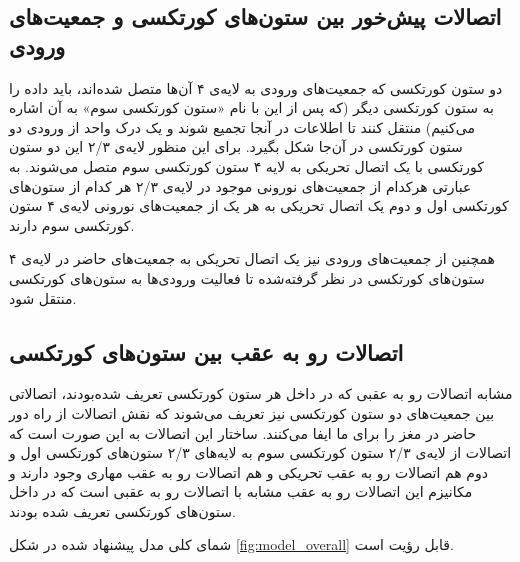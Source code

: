 \documentclass[12pt]{report}
\begin{document}
	
	\subsection{اتصالات پیش‌خور بین ستون‌های کورتکسی و جمعیت‌های ورودی}
	
	دو ستون کورتکسی‌ که جمعیت‌های ورودی به لایه‌ی ۴ آن‌ها متصل شده‌اند، باید داده را به ستون کورتکسی دیگر (که پس از این با نام «ستون کورتکسی سوم» به آن اشاره می‌کنیم) منتقل کنند تا اطلاعات در آنجا تجمیع شوند و یک درک واحد از ورودی دو ستون کورتکسی در آن‌جا شکل بگیرد. برای این منظور لایه‌ی ۲/۳ این دو ستون کورتکسی با یک اتصال تحریکی به لایه ۴ ستون کورتکسی سوم متصل می‌شوند. به عبارتی هرکدام از جمعیت‌های نورونی موجود در لایه‌ی ۲/۳ هر کدام از ستون‌های کورتکسی اول و دوم یک اتصال تحریکی به هر‌ یک از جمعیت‌های نورونی لایه‌ی ۴ ستون کورتکسی سوم دارند. 
	
	همچنین از جمعیت‌های ورودی نیز یک اتصال تحریکی به جمعیت‌های حاضر در لایه‌ی ۴ ستون‌های کورتکسی در نظر گرفته‌شده تا فعالیت ورودی‌ها به ستون‌های کورتکسی منتقل شود.
	
	\subsection{اتصالات رو‌ به عقب بین ستون‌های کورتکسی}
	
	مشابه اتصالات رو به عقبی که در داخل هر ستون کورتکسی تعریف شده‌بودند، اتصالاتی بین جمعیت‌های دو ستون کورتکسی نیز تعریف می‌شوند که نقش اتصالات از راه دور حاضر در مغز را برای ما ایفا می‌کنند. ساختار این اتصالات به این صورت است که اتصالات از لایه‌ی ۲/۳ ستون کورتکسی سوم به لایه‌های ۲/۳ ستون‌های کورتکسی اول و دوم هم اتصالات رو به عقب تحریکی و هم اتصالات رو به عقب مهاری وجود دارند و مکانیزم این اتصالات رو به عقب مشابه با اتصالات رو به عقبی است که در داخل ستون‌های کورتکسی تعریف شده بودند.
	
	شمای کلی مدل پیشنهاد شده در شکل \ref{fig:model_overall} قابل رؤیت است.
	
\end{document}
